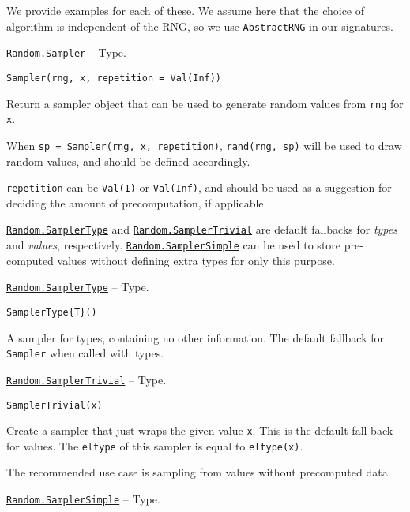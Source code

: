 We provide examples for each of these. We assume here that the choice of algorithm is independent of the RNG, so we use \texttt{AbstractRNG} in our signatures.


\hypertarget{6931553397315604036}{}
\hyperlink{6931553397315604036}{\texttt{Random.Sampler}}  -- {Type.}

\begin{adjustwidth}{2em}{0pt}


\begin{verbatim}
Sampler(rng, x, repetition = Val(Inf))
\end{verbatim}

Return a sampler object that can be used to generate random values from \texttt{rng} for \texttt{x}.

When \texttt{sp = Sampler(rng, x, repetition)}, \texttt{rand(rng, sp)} will be used to draw random values, and should be defined accordingly.

\texttt{repetition} can be \texttt{Val(1)} or \texttt{Val(Inf)}, and should be used as a suggestion for deciding the amount of precomputation, if applicable.

\hyperlink{2169729397706095790}{\texttt{Random.SamplerType}} and \hyperlink{2575204551890994411}{\texttt{Random.SamplerTrivial}} are default fallbacks for \emph{types} and \emph{values}, respectively. \hyperlink{17949645161476858061}{\texttt{Random.SamplerSimple}} can be used to store pre-computed values without defining extra types for only this purpose.



\end{adjustwidth}
\hypertarget{2169729397706095790}{}
\hyperlink{2169729397706095790}{\texttt{Random.SamplerType}}  -- {Type.}

\begin{adjustwidth}{2em}{0pt}


\begin{verbatim}
SamplerType{T}()
\end{verbatim}

A sampler for types, containing no other information. The default fallback for \texttt{Sampler} when called with types.



\end{adjustwidth}
\hypertarget{2575204551890994411}{}
\hyperlink{2575204551890994411}{\texttt{Random.SamplerTrivial}}  -- {Type.}

\begin{adjustwidth}{2em}{0pt}


\begin{verbatim}
SamplerTrivial(x)
\end{verbatim}

Create a sampler that just wraps the given value \texttt{x}. This is the default fall-back for values. The \texttt{eltype} of this sampler is equal to \texttt{eltype(x)}.

The recommended use case is sampling from values without precomputed data.



\end{adjustwidth}
\hypertarget{17949645161476858061}{}
\hyperlink{17949645161476858061}{\texttt{Random.SamplerSimple}}  -- {Type.}


